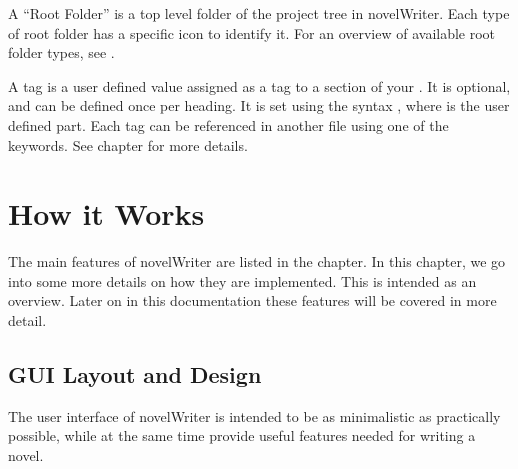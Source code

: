 \documentclass[a4paper,11pt,english]{sphinxmanual}
\begin{document}
\begin{description}
\sphinxAtStartPar
A “Root Folder” is a top level folder of the project tree in novelWriter. Each type of root
folder has a specific icon to identify it. For an overview of available root folder types,
see {\hyperref[\detokenize{project_overview:a-proj-roots}]{}}.

\sphinxAtStartPar
A tag is a user defined value assigned as a tag to a section of your {\hyperref[\detokenize{int_glossary:term-Project-Notes}]{}}.
It is optional, and can be defined once per heading. It is set using the {\hyperref[\detokenize{int_glossary:term-Keyword}]{}}
syntax , where  is the user defined part. Each tag can be referenced
in another file using one of the {\hyperref[\detokenize{int_glossary:term-Reference}]{}} keywords. See {\hyperref[\detokenize{project_references:a-references}]{}} chapter
for more details.

\end{description}

\sphinxstepscope


\chapter{How it Works}
\label{\detokenize{usage_breakdown:how-it-works}}\label{\detokenize{usage_breakdown:a-breakdown}}\label{\detokenize{usage_breakdown::doc}}
\sphinxAtStartPar
The main features of novelWriter are listed in the {\hyperref[\detokenize{int_introduction:a-intro}]{}} chapter. In this chapter, we go
into some more details on how they are implemented. This is intended as an overview. Later on in
this documentation these features will be covered in more detail.


\section{GUI Layout and Design}
\label{\detokenize{usage_breakdown:gui-layout-and-design}}\label{\detokenize{usage_breakdown:a-breakdown-design}}
\sphinxAtStartPar
The user interface of novelWriter is intended to be as minimalistic as practically possible, while
at the same time provide useful features needed for writing a novel.
\end{document}

